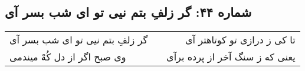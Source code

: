 \begin{center}
\section*{شماره ۴۴: گر زلفِ بتم نیی تو ای شب بسر آی}
\label{sec:044}
\begin{longtable}{l p{0.5cm} r}
گر زلفِ بتم نیی تو ای شب بسر آی
&&
تا کی ز درازی تو کوتاهتر آی
\\
وی صبح اگر از دل کُهْ میندمی
&&
یعنی که ز سنگ آخر از پرده برآی
\\
\end{longtable}
\end{center}
